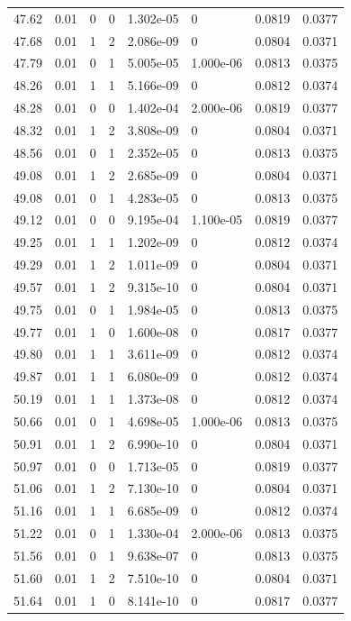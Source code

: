 \documentclass[preview]{standalone}
\begin{document}
{{{{{{{\begin{tabular}{L{1.2cm}C{1.2cm} C{0.3cm}C{0.5cm} C{1.4cm}C{1.4cm} C{1.4cm}C{1.4cm}}
  47.62  &  0.01  & 0     &  0 &  1.302e-05  & 0  & 0.0819 &  0.0377   \\ 
  47.68  &  0.01  & 1     &  2 &  2.086e-09  & 0  & 0.0804 &  0.0371   \\ 
  47.79  &  0.01  & 0     &  1 &  5.005e-05  & 1.000e-06  & 0.0813 &  0.0375   \\ 
  48.26  &  0.01  & 1     &  1 &  5.166e-09  & 0  & 0.0812 &  0.0374   \\ 
  48.28  &  0.01  & 0     &  0 &  1.402e-04  & 2.000e-06  & 0.0819 &  0.0377   \\ 
  48.32  &  0.01  & 1     &  2 &  3.808e-09  & 0  & 0.0804 &  0.0371   \\ 
  48.56  &  0.01  & 0     &  1 &  2.352e-05  & 0  & 0.0813 &  0.0375   \\ 
  49.08  &  0.01  & 1     &  2 &  2.685e-09  & 0  & 0.0804 &  0.0371   \\ 
  49.08  &  0.01  & 0     &  1 &  4.283e-05  & 0  & 0.0813 &  0.0375   \\ 
  49.12  &  0.01  & 0     &  0 &  9.195e-04  & 1.100e-05  & 0.0819 &  0.0377   \\ 
  49.25  &  0.01  & 1     &  1 &  1.202e-09  & 0  & 0.0812 &  0.0374   \\ 
  49.29  &  0.01  & 1     &  2 &  1.011e-09  & 0  & 0.0804 &  0.0371   \\ 
  49.57  &  0.01  & 1     &  2 &  9.315e-10  & 0  & 0.0804 &  0.0371   \\ 
  49.75  &  0.01  & 0     &  1 &  1.984e-05  & 0  & 0.0813 &  0.0375   \\ 
  49.77  &  0.01  & 1     &  0 &  1.600e-08  & 0  & 0.0817 &  0.0377   \\ 
  49.80  &  0.01  & 1     &  1 &  3.611e-09  & 0  & 0.0812 &  0.0374   \\ 
  49.87  &  0.01  & 1     &  1 &  6.080e-09  & 0  & 0.0812 &  0.0374   \\ 
  50.19  &  0.01  & 1     &  1 &  1.373e-08  & 0  & 0.0812 &  0.0374   \\ 
  50.66  &  0.01  & 0     &  1 &  4.698e-05  & 1.000e-06  & 0.0813 &  0.0375   \\ 
  50.91  &  0.01  & 1     &  2 &  6.990e-10  & 0  & 0.0804 &  0.0371   \\ 
  50.97  &  0.01  & 0     &  0 &  1.713e-05  & 0  & 0.0819 &  0.0377   \\ 
  51.06  &  0.01  & 1     &  2 &  7.130e-10  & 0  & 0.0804 &  0.0371   \\ 
  51.16  &  0.01  & 1     &  1 &  6.685e-09  & 0  & 0.0812 &  0.0374   \\ 
  51.22  &  0.01  & 0     &  1 &  1.330e-04  & 2.000e-06  & 0.0813 &  0.0375   \\ 
  51.56  &  0.01  & 0     &  1 &  9.638e-07  & 0  & 0.0813 &  0.0375   \\ 
  51.60  &  0.01  & 1     &  2 &  7.510e-10  & 0  & 0.0804 &  0.0371   \\ 
  51.64  &  0.01  & 1     &  0 &  8.141e-10  & 0  & 0.0817 &  0.0377   \\ 
\hline 
\end{tabular} 

}}}}}}}
\end{document}
